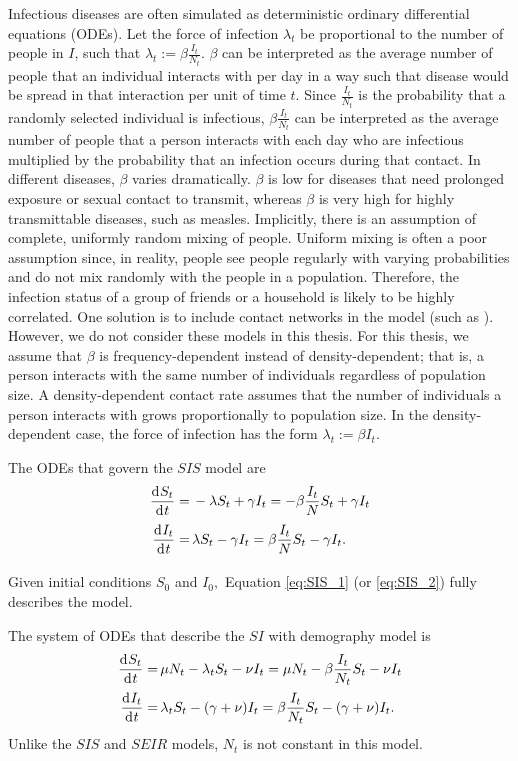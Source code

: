 Infectious diseases are often simulated as deterministic ordinary differential
equations (ODEs).
Let the force of infection $\lambda_t$ be
proportional to the number of people in $I$, such that
$\lambda_t := \beta \frac{I_t}{N_t}.$ $\beta$ can be interpreted as the average
number of people that an individual interacts with per day in a way such that
disease would be spread in that interaction per unit of time $t$.
Since $\frac{I_t}{N_t}$
is the probability that a randomly selected individual is infectious,
$\beta \frac{I_t}{N_t}$ can be interpreted as the average number of people that
a person interacts with each day who are infectious multiplied by the
probability that an infection occurs during that contact.
In different diseases, $\beta$ varies dramatically. $\beta$ is low for
diseases that need prolonged exposure or sexual contact to transmit, whereas
$\beta$ is very high 
for highly transmittable diseases, such as measles.
Implicitly, there is an assumption of complete, uniformly
random mixing of people. Uniform mixing is often a poor assumption since, 
in reality,
people see people regularly with varying probabilities and
do not mix randomly with the people in a population.
Therefore, the infection status
of a group of friends or a household is likely to be highly correlated.
One solution is to include contact networks in the model
(such as \cite{kerr_covasim_2021}). However, we do not consider these models in
this thesis.
For this thesis, we assume that $\beta$ is
frequency-dependent instead of density-dependent; that is,
a person interacts with the same number of individuals regardless
of population size. A density-dependent contact rate assumes that the number
of individuals a person interacts with
grows proportionally to population size. In the density-dependent case, the force
of infection has the form $\lambda_t := \beta I_t.$

The ODEs that govern the $SIS$ model
are \begin{align}
    \frac{\diff S_t}{\diff t}
    = & \, -\lambda S_t + \gamma I_t
    = -\beta \frac{I_t}{N}S_t + \gamma I_t\label{eq:SIS_1} \\
    \frac{\diff I_t}{\diff t}
    = & \, \lambda S_t - \gamma I_t
    = \beta \frac{I_t}{N}S_t - \gamma I_t\label{eq:SIS_2}.
\end{align}

Given initial conditions $S_0$ and $I_0,$ Equation
\ref{eq:SIS_1} (or \ref{eq:SIS_2}) fully describes the model.

The system of ODEs that describe the $SI$ with demography model is \begin{align}
    \frac{\diff S_t}{\diff t}
    = & \, \mu N_t - \lambda_t S_t - \nu I_t
    = \mu N_t -\beta \frac{I_t}{N_t}S_t - \nu I_t \label{eq:SI_1} \\
    \frac{\diff I_t}{\diff t}
    = & \, \lambda_t S_t - (\gamma + \nu)I_t
    = \beta \frac{I_t}{N_t}S_t - (\gamma + \nu) I_t\label{eq:SI_2}.
\end{align}
Unlike the $SIS$ and $SEIR$ models, $N_t$ is not constant in this model.

